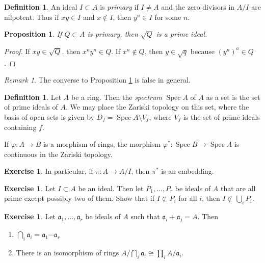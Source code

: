 \documentclass[leqno, openany]{memoir}
\newtheorem{prop}[thm]{Proposition}
\theoremstyle{definition}
\newtheorem{defn}[thm]{Definition}
\newtheorem{exer}[thm]{Exercise}
\theoremstyle{remark}
\newtheorem{rmk}[thm]{Remark}
\theoremstyle{plain}
\theoremstyle{definition}
\theoremstyle{remark}
\newcommand{\mf}[1]{\mathfrak{#1}}
\DeclareMathOperator{\spec}{Spec}
\begin{document}
\begin{defn} An ideal $I \subset A$ is \textit{primary} if $I \neq A$ and the
zero divisors in $A/I$ are nilpotent. Thus if $xy \in I$ and $x \notin I$, then
$y^n \in I$ for some $n$.  \end{defn}

\begin{prop} \label{prop:radical_of_primary} If $Q \subset A$ is primary, then
$\sqrt{Q}$ is a prime ideal.  \end{prop}

\begin{proof} If $xy \in \sqrt{Q}$, then $x^ny^n \in Q$. If $x^n \notin Q$,
then $y \in \sqrt{q}$ because $(y^n)^a \in Q$.  \end{proof}

\begin{rmk} The converse to Proposition \ref{prop:radical_of_primary} is false
in general.  \end{rmk}

\begin{defn} Let $A$ be a ring. Then the \textit{spectrum} $\spec A$ of $A$ as
    a set is the set of prime ideals of $A$. We may place the Zariski topology
    on this set, where the basis of open sets is given by $D_f = \spec A
    \setminus V_f$, where $V_f$ is the set of prime ideals containing $f$.
\end{defn}

If $\varphi:A \to B$ is a morphism of rings, the morphism $\varphi^*: \spec B
\to \spec A$ is continuous in the Zariski topology. 

\begin{exer} In particular, if $\pi: A \to A/I$, then $\pi^*$ is an embedding.
\end{exer}

\begin{exer} Let $I \subset A$ be an ideal. Then let $P_1, \ldots, P_r$ be
ideals of $A$ that are all prime except possibly two of them. Show that if $I
\not\subset P_i$ for all $i$, then $I \not\subset \bigcup_i P_i$.  \end{exer}

\begin{exer} Let $ \mathfrak{a}_1, \ldots, \mathfrak{a}_r$ be ideals of $A$
    such that $ \mathfrak{a}_i + \mathfrak{a}_j = A $. Then \begin{enumerate}
        \item $\bigcap_i \mathfrak{a}_i = \mathfrak{a}_1 \cdots \mathfrak{a}_r$
        \item There is an isomorphism of rings $A/ \bigcap_i \mf{a}_i \cong
            \prod_i A/\mf{a}_i$.  \end{enumerate} \end{exer}
\end{document}
